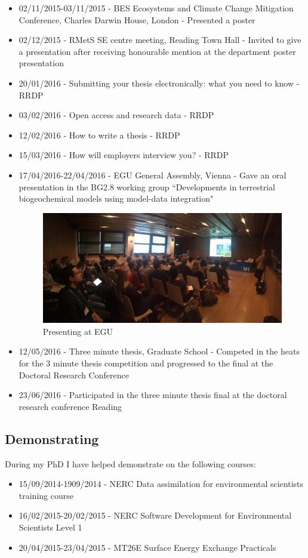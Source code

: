 \documentclass[11pt]{article}
\begin{document}
\begin{itemize}
\item 02/11/2015-03/11/2015 - BES Ecosystems and Climate Change Mitigation Conference, Charles Darwin House, London - Presented a poster

\item 02/12/2015 - RMetS SE centre meeting, Reading Town Hall - Invited to give a presentation after receiving honourable mention at the department poster presentation

\item 20/01/2016 - Submitting your thesis electronically: what you need to know - RRDP

\item 03/02/2016 - Open access and research data - RRDP

\item 12/02/2016 - How to write a thesis - RRDP

\item 15/03/2016 - How will employers interview you? - RRDP

\item 17/04/2016-22/04/2016 - EGU General Assembly, Vienna - Gave an oral presentation in the BG2.8 working group ``Developments in terrestrial biogeochemical models using model-data integration"

\begin{figure}[!ht]
    \centering
    \includegraphics[width=.4\textwidth]{egu2.jpg}
    \caption{Presenting at EGU}
    \label{fig:egu}
\end{figure}

\item 12/05/2016 - Three minute thesis, Graduate School - Competed in the heats for the 3 minute thesis competition and progressed to the final at the Doctoral Research Conference

\item 23/06/2016 - Participated in the three minute thesis final at the doctoral research conference Reading
\end{itemize}



\subsection{Demonstrating}
During my PhD I have helped demonstrate on the following courses:
\begin{itemize}
\item 15/09/2014-1909/2014 - NERC Data assimilation for environmental scientists training course

\item 16/02/2015-20/02/2015 - NERC Software Development for Environmental Scientists Level 1

\item 20/04/2015-23/04/2015 - MT26E Surface Energy Exchange Practicals
\end{itemize}
\end{document}
